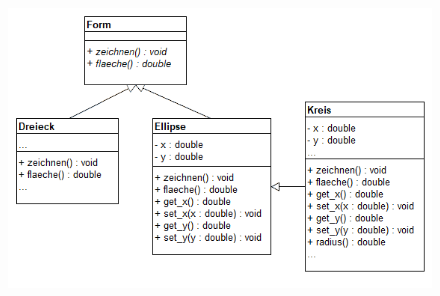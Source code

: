 					\begin{figure}[H]
						\includegraphics[scale=0.6]{polymorphie/universell/vererbung/ellipse-kreis-problem/problem.png}
					\end{figure}
				
